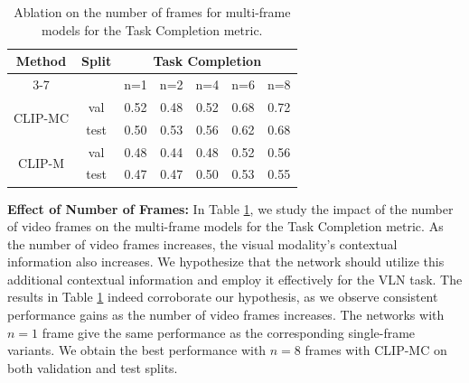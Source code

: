 \documentclass[11pt]{article}
\begin{document}
\begin{table}[]
\begin{center}
\small
\begin{tabular}{|c|c|ccccc|}
\hline
\multirow{2}{*}{Method} & \multirow{2}{*}{Split} & \multicolumn{5}{c|}{Task Completion}                                                                                 \\ \cline{3-7} 
                        &                        & \multicolumn{1}{c|}{n=1}  & \multicolumn{1}{c|}{n=2}  & \multicolumn{1}{c|}{n=4}  & \multicolumn{1}{c|}{n=6}  & n=8  \\ \hline
\multirow{2}{*}{CLIP-MC} & val & \multicolumn{1}{c|}{0.52} & \multicolumn{1}{c|}{0.48} & \multicolumn{1}{c|}{0.52} & \multicolumn{1}{c|}{0.68} & 0.72 \\ \cline{2-7} 
                        & test                   & \multicolumn{1}{c|}{0.50} & \multicolumn{1}{c|}{0.53} & \multicolumn{1}{c|}{0.56} & \multicolumn{1}{c|}{0.62} & 0.68 \\ \hline
\multirow{2}{*}{CLIP-M}  & val & \multicolumn{1}{c|}{0.48} & \multicolumn{1}{c|}{0.44}     & \multicolumn{1}{c|}{0.48}     & \multicolumn{1}{c|}{0.52} & 0.56 \\ \cline{2-7} 
                        & test                   & \multicolumn{1}{c|}{0.47} & \multicolumn{1}{c|}{0.47}     & \multicolumn{1}{c|}{0.50}     & \multicolumn{1}{c|}{0.53} & 0.55 \\ \hline
\end{tabular}%
\end{center}
\caption{Ablation on the number of frames for multi-frame models for the Task Completion metric.}
\label{table:table_3}
\end{table}

\textbf{Effect of Number of Frames: }In Table \ref{table:table_3}, we study the impact of the number of video frames on the multi-frame models for the Task Completion metric. As the number of video frames increases, the visual modality's contextual information also increases. We hypothesize that the network should utilize this additional contextual information and employ it effectively for the VLN task. The results in Table \ref{table:table_3} indeed corroborate our hypothesis, as we observe consistent performance gains as the number of video frames increases. The networks with $n = 1$ frame give the same performance as the corresponding single-frame variants. We obtain the best performance with $n = 8$ frames with CLIP-MC on both validation and test splits.
\end{document}
